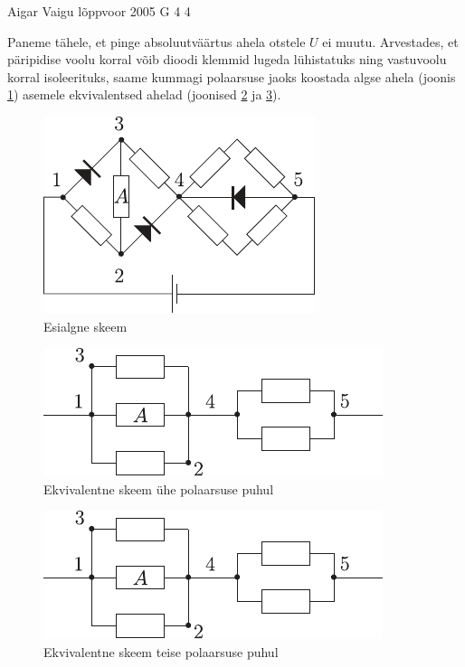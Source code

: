 \documentclass[11pt]{article}
\begin{document}
{%
{Aigar Vaigu} %
{lõppvoor} %
{2005} %
{G 4} %
{4} %
{

\ifSolution
Paneme tähele, et pinge absoluutväärtus ahela otstele $U$ ei muutu. Arvestades, et päripidise voolu korral võib dioodi klemmid lugeda lühistatuks ning vastuvoolu korral isoleerituks, saame kummagi polaarsuse jaoks koostada algse ahela (joonis \ref{2005-v3g-04:fig1}) asemele ekvivalentsed ahelad (joonised \ref{2005-v3g-04:fig2} ja \ref{2005-v3g-04:fig3}).

\begin{figure}[h]
	\centering
	\includegraphics[width=0.6\linewidth]{2005-v3g-04-lah1}
	\caption{Esialgne skeem}
	\label{2005-v3g-04:fig1}
\end{figure}
\begin{figure}[h]
	\centering
	\includegraphics[width=0.6\linewidth]{2005-v3g-04-lah2}
	\caption{Ekvivalentne skeem ühe polaarsuse puhul}
	\label{2005-v3g-04:fig2}
\end{figure}
\begin{figure}[h]
	\centering
	\includegraphics[width=0.6\linewidth]{2005-v3g-04-lah2}
	\caption{ Ekvivalentne skeem teise polaarsuse puhul}
	\label{2005-v3g-04:fig3}
\end{figure}

}}
\end{document}
